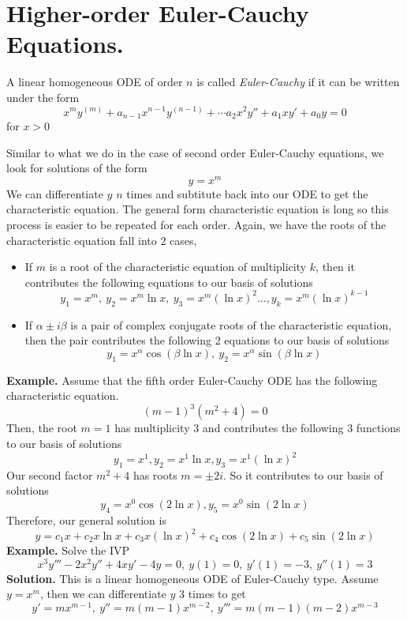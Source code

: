 \documentclass[openany]{report}
\begin{document}
    \section{Higher-order Euler-Cauchy Equations.}
    \begin{definition}
        A linear homogeneous ODE of order $n$ is called \emph{Euler-Cauchy} if it can be written under the form 
        \[x^my^{(m)} + a_{n-1}x^{n-1}y^{(n-1)} + \cdots a_2x^2y'' + a_1xy' + a_0 y = 0 \]
        for $x > 0$
    \end{definition}
    Similar to what we do in the case of second order Euler-Cauchy equations, we look for solutions of the form
    \[y = x^m\]
    We can differentiate $y$ $n$ times and subtitute back into our ODE to get the characteristic equation. The general form characteristic equation is long so this process is easier to be repeated for each order. Again, we have the roots of the characteristic equation fall into 2 cases,
    \begin{itemize}
        \item If $m$ is a root of the characteristic equation of multiplicity $k$, then it contributes the following equations to our basis of solutions
        \[y_1 = x^m, \ y_2 = x^m\ln x, \ y_3 = x^m (\ln x)^2 \ldots, y_k = x^m(\ln x)^{k-1}\]
        \item If $\alpha \pm i\beta$ is a pair of complex conjugate roots of the characteristic equation, then the pair contributes the following 2 equations to our basis of solutions
        \[y_1 = x^{\alpha} \cos(\beta \ln x), \ y_2 = x^\alpha\sin(\beta \ln x)\]
    \end{itemize}
    \noindent
    \textbf{Example.} Assume that the fifth order Euler-Cauchy ODE has the following characteristic equation.
    \[(m-1)^3(m^2+4) = 0\]
    Then, the root $m=1$ has multiplicity 3 and contributes the following 3 functions to our basis of solutions
    \[y_1 = x^1, y_2 = x^1 \ln x, y_3 = x^1(\ln x)^2\]
    Our second factor $m^2 + 4$ has roots $m = \pm 2i$. So it contributes to our basis of solutions 
    \[y_4 = x^0 \cos (2\ln x), y_5 = x^0 \sin(2 \ln x)\]
    Therefore, our general solution is 
    \[y = c_1x + c_2x\ln x + c_3 x (\ln x)^2 + c_4 \cos (2\ln x) + c_5\sin(2\ln x)\]
    \textbf{Example.} Solve the IVP 
    \[x^3y''' - 2x^2y'' + 4xy' - 4y = 0, \ y(1) = 0, \ y'(1) = -3, \ y''(1) = 3\]
    \textbf{Solution.} This is a linear homogeneous ODE of Euler-Cauchy type. Assume $y = x^m$, then we can differentiate $y$ 3 times to get
    \[y' = mx^{m-1}, \ y'' = m(m-1)x^{m-2}, \ y''' = m(m-1)(m-2)x^{m-3}\]
\end{document}

